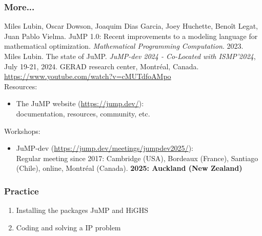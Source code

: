 \documentclass[]{beamer}
\newcommand*{\blue}[1]{\textcolor{nblue}{#1}}
\begin{document}
%
%
\begin{frame}
  \frametitle{More...}
\vspace{3mm}

{\footnotesize

 Miles Lubin, Oscar Dowson, Joaquim {Dias Garcia}, Joey Huchette, Beno{\^i}t Legat, Juan Pablo Vielma.
{JuMP} 1.0: {R}ecent improvements to a modeling language for mathematical optimization.
\textit{Mathematical Programming Computation}. 2023.\vspace{5mm}\\

Miles Lubin. 
The state of JuMP. 
\textit{JuMP-dev 2024 - Co-Located with ISMP'2024}, July 19-21, 2024. GERAD research center, Montréal, Canada.\\
\url{https://www.youtube.com/watch?v=cMUTdfoAMpo} \vspace{5mm}\\


Resources:\\
\begin{itemize}
\item[] \blue{The JuMP website} (\url{https://jump.dev/}):\\
documentation, resources, community, etc. \vspace{4mm}
\end{itemize}

Workshops:\\
\begin{itemize}
\item[] \blue{JuMP-dev} (\url{https://jump.dev/meetings/jumpdev2025/}): \\
Regular meeting since 2017: Cambridge (USA), Bordeaux (France), Santiago (Chile), online, Montréal (Canada). \textbf{2025: Auckland (New Zealand)} %
\end{itemize}
}
   
\end{frame}

% 
%

\begin{frame}
  \frametitle{Practice}
\vspace{3mm}

\begin{enumerate}
\item Installing the packages JuMP and HiGHS

\item Coding and solving a IP problem \vspace{3mm}

\end{enumerate}

\end{frame}
\end{document}
